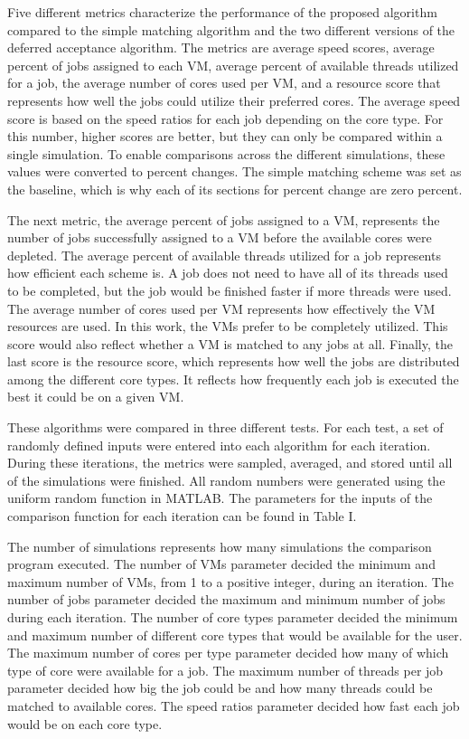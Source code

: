 \documentclass[conference]{IEEEtran}
\begin{document}
Five different metrics characterize the performance of the proposed algorithm compared to the simple matching algorithm
and the two different versions of the deferred acceptance algorithm.  
The metrics are average speed scores, average percent of jobs assigned to each VM, average percent of available threads utilized for a job, 
the average number of cores used per VM, and a resource score that represents how well the jobs could utilize their preferred cores.  
The average speed score is based on the speed ratios for each job depending on the core type.  
For this number, higher scores are better, but they can only be compared within a single simulation.  
To enable comparisons across the different simulations, these values were converted to percent changes.  
The simple matching scheme was set as the baseline, which is why each of its sections for percent change
are zero percent.

The next metric, the average percent of jobs assigned to a VM,
represents the number of jobs successfully assigned to a VM before the available cores were depleted.  
The average percent of available threads utilized for a job represents how efficient each scheme is.  
A job does not need to have all of its threads used to be completed, but the job would be finished faster if more threads were used.  
The average number of cores used per VM represents how effectively the VM resources are used.
In this work, the VMs prefer to be completely utilized. 
This score would also reflect whether a VM is matched to any jobs at all.
Finally, the last score is the resource score, which represents how well the jobs are distributed among the different core types.  
It reflects how frequently each job is executed the best it could be on a given VM. 

These algorithms were compared in three different tests.  
For each test, 
a set of randomly defined inputs were entered into each algorithm 
for each iteration.  
During these iterations, the metrics were sampled, 
averaged, and stored until all of the simulations were finished.  
All random
numbers were generated using the uniform random function in MATLAB.  
The parameters for the inputs of the comparison function for each 
iteration can be found in Table I.

The number of simulations represents how many simulations the comparison 
program executed.  The number of VMs parameter decided the minimum 
and maximum number of VMs, from 1 to a positive integer, during an iteration.  
The number of jobs parameter decided the maximum and minimum number 
of jobs during each iteration.  The number of core types parameter decided 
the minimum and maximum number of different core types that would be 
available for the user.  The maximum number of cores per type parameter 
decided how many of which type of core were available for a job.  
The maximum number of threads per job parameter decided how big the
 job could be and how many threads could be matched to available cores.  
The speed ratios parameter decided how fast each job would be on each core type.
\end{document}

